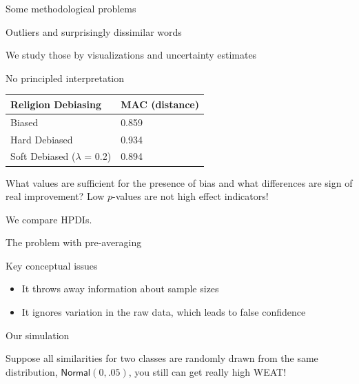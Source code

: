 \documentclass[10pt,ignorenonframetext,x11names, dvipsnames, bibspacing,natbib]{beamer}
\providecommand{\tightlist}{%
  \setlength{\itemsep}{0pt}\setlength{\parskip}{0pt}}
\begin{document}
\begin{frame}{Some methodological problems}

\begin{block}{Outliers and surprisingly dissimilar words}

We study those by visualizations and uncertainty estimates

\pause

\end{block}

\begin{block}{No principled interpretation}

\begin{longtable}[]{@{}ll@{}}
\toprule
Religion Debiasing & MAC (distance)\tabularnewline
\midrule
\endhead
Biased & 0.859\tabularnewline
Hard Debiased & 0.934\tabularnewline
Soft Debiased (\(\lambda\) = 0.2) & 0.894\tabularnewline
\bottomrule
\end{longtable}

What values are sufficient for the presence of bias and what differences
are sign of real improvement? Low \(p\)-values are not high effect
indicators!

We compare HPDIs.

\end{block}

\end{frame}

\begin{frame}{The problem with pre-averaging}

\begin{block}{Key conceptual issues}

\begin{itemize}
\tightlist
\item
  It throws away information about sample sizes
\item
  It ignores variation in the raw data, which leads to false confidence
\end{itemize}

\end{block}

\begin{block}{Our simulation}

Suppose all similarities for two classes are randomly drawn from the
same distribution, \(\mathsf{Normal}(0,.05)\), you still can get really
high WEAT!

\end{block}

\end{frame}
\end{document}
